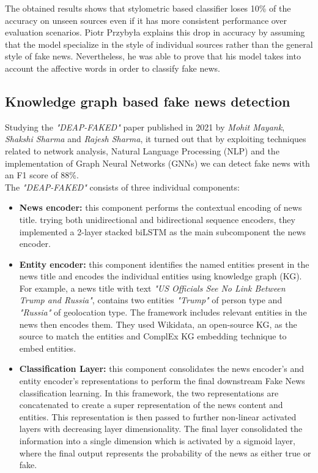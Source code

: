 \documentclass[10pt, english]{report}
\begin{document}
The obtained results shows that stylometric based classifier loses 10\% of the accuracy on unseen sources even if it has more consistent performance over evaluation scenarios. Piotr Przybyła explains this drop in accuracy by assuming that the model specialize in the style of individual sources rather than the general style of fake news. Nevertheless, he was able to prove that his model takes into account the affective words in order to classify fake news.
\subsection{Knowledge graph based fake news detection \cite{mayank2021deap}}
Studying the \textit{"DEAP-FAKED"} paper published in 2021 by \textit{Mohit Mayank}, \textit{Shakshi Sharma} and \textit{Rajesh Sharma}, it turned out that by exploiting techniques related to network analysis, Natural Language Processing (NLP) and the implementation of Graph Neural Networks (GNNs) we can detect fake news with an F1 score of 88\%.\\

The \textit{"DEAP-FAKED"} consists of three individual components:

\begin{itemize}
\item \textbf{News encoder:} this component performs the contextual encoding of news title. trying both unidirectional and bidirectional sequence encoders, they implemented a 2-layer stacked biLSTM as the main subcomponent the news encoder.
\item \textbf{Entity encoder:} this component identifies the named entities present in the news title and encodes the individual entities using knowledge graph (KG).
For example, a news title with text \textit{"US Officials See No Link Between Trump and Russia"}, contains two entities \textit{"Trump"} of person type and \textit{"Russia"} of geolocation type.
The framework includes relevant entities in the news then encodes them. They used Wikidata, an open-source KG, as the source to match the entities and ComplEx KG embedding technique to embed entities.
\item \textbf{Classification Layer:} this component consolidates the news encoder's and entity encoder's representations to perform the final downstream Fake News classification learning.
In this framework, the two representations are concatenated to create a super representation of the news content and entities. This representation is then passed to further non-linear activated layers with decreasing layer dimensionality. The final layer consolidated the information into a single dimension which is activated by a sigmoid layer, where the final output represents the probability of the news as either true or fake.
\end{itemize}
\end{document}
